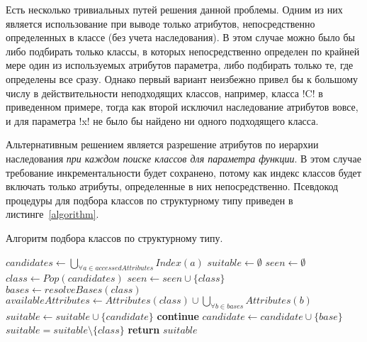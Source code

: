 Есть несколько тривиальных путей решения данной проблемы. Одним из них является
использование при выводе только атрибутов, непосредственно определенных в классе
(без учета наследования). В этом случае можно было бы либо подбирать только
классы, в которых непосредственно определен по крайней мере один из используемых
атрибутов параметра, либо подбирать только те, где определены все сразу. Однако
первый вариант неизбежно привел бы к большому числу в действительности
неподходящих классов, например, класса !C! в приведенном примере, тогда как второй
исключил наследование атрибутов вовсе, и для параметра !x! не было бы
найдено ни одного подходящего класса.

Альтернативным решением является разрешение атрибутов по иерархии наследования
\emph{при каждом поиске классов для параметра функции}. В этом случае требование
инкрементальности будет сохранено, потому как индекс классов будет включать
только атрибуты, определенные в них непосредственно. Псевдокод процедуры для
подбора классов по структурному типу приведен в листинге~\ref{algorithm}. 

\begin{algorithm}
  \caption{Алгоритм подбора классов по структурному типу.}
  \label{algorithm}
  \begin{algorithmic}
  \small
    \State $candidates \gets \bigcup_{\forall a \in accessedAttributes} Index(a)$
    \State $suitable \gets \emptyset$
    \State $seen \gets \emptyset$
      \State $class \gets Pop(candidates)$
      \State $seen \gets seen \cup \{class\}$
      \State $bases \gets resolveBases(class)$
      \State $availableAttributes \gets Attributes(class) \cup \bigcup_{\forall{b} \in bases} Attributes(b)$
        \State $suitable \gets suitable \cup \{candidate\}$
      \EndIf
        \State \textbf{continue}
        \EndIf
            \State $candidate \gets candidate \cup \{base\}$
          \EndIf
      \EndFor
    \EndWhile
        \State $suitable = suitable \setminus \{ class \}$
      \EndIf
    \EndFor
  \State \textbf{return} $suitable$
  \EndFunction
  \end{algorithmic}
\end{algorithm}


